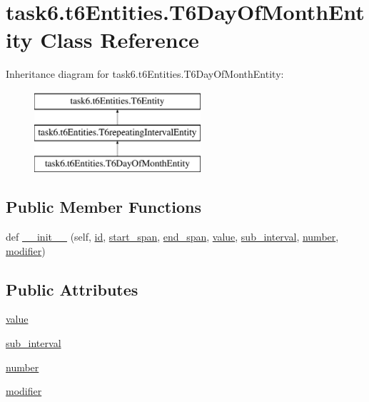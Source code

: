 \hypertarget{classtask6_1_1t6Entities_1_1T6DayOfMonthEntity}{}\section{task6.\+t6\+Entities.\+T6\+Day\+Of\+Month\+Entity Class Reference}
\label{classtask6_1_1t6Entities_1_1T6DayOfMonthEntity}
Inheritance diagram for task6.\+t6\+Entities.\+T6\+Day\+Of\+Month\+Entity\+:\begin{figure}[H]
\begin{center}
\leavevmode
\includegraphics[height=3.000000cm]{classtask6_1_1t6Entities_1_1T6DayOfMonthEntity}
\end{center}
\end{figure}
\subsection*{Public Member Functions}
\begin{DoxyCompactItemize}
\item 
def \hyperlink{classtask6_1_1t6Entities_1_1T6DayOfMonthEntity_a8b5810d8829d1226febe1f06782ff8d9}{\+\_\+\+\_\+init\+\_\+\+\_\+} (self, \hyperlink{classtask6_1_1t6Entities_1_1T6Entity_afeeced8134bb3ebe0cfecc64d0ab46a4}{id}, \hyperlink{classtask6_1_1t6Entities_1_1T6Entity_a52779e9af8864dc98e8b02fc5b9b041a}{start\+\_\+span}, \hyperlink{classtask6_1_1t6Entities_1_1T6Entity_aeb402200b156cd9562c5111dfe777b98}{end\+\_\+span}, \hyperlink{classtask6_1_1t6Entities_1_1T6DayOfMonthEntity_a7b9456d2643595389e1173d6fd711707}{value}, \hyperlink{classtask6_1_1t6Entities_1_1T6DayOfMonthEntity_acdd7f04a1c0cce56487178878ffb5a9f}{sub\+\_\+interval}, \hyperlink{classtask6_1_1t6Entities_1_1T6DayOfMonthEntity_a2eb2f5e038b5a98ce78c3a0dc8f127ac}{number}, \hyperlink{classtask6_1_1t6Entities_1_1T6DayOfMonthEntity_a922d2d4fa863d6c8007a32eace7d97d6}{modifier})
\end{DoxyCompactItemize}
\subsection*{Public Attributes}
\begin{DoxyCompactItemize}
\item 
\hyperlink{classtask6_1_1t6Entities_1_1T6DayOfMonthEntity_a7b9456d2643595389e1173d6fd711707}{value}
\item 
\hyperlink{classtask6_1_1t6Entities_1_1T6DayOfMonthEntity_acdd7f04a1c0cce56487178878ffb5a9f}{sub\+\_\+interval}
\item 
\hyperlink{classtask6_1_1t6Entities_1_1T6DayOfMonthEntity_a2eb2f5e038b5a98ce78c3a0dc8f127ac}{number}
\item 
\hyperlink{classtask6_1_1t6Entities_1_1T6DayOfMonthEntity_a922d2d4fa863d6c8007a32eace7d97d6}{modifier}
\end{DoxyCompactItemize}


